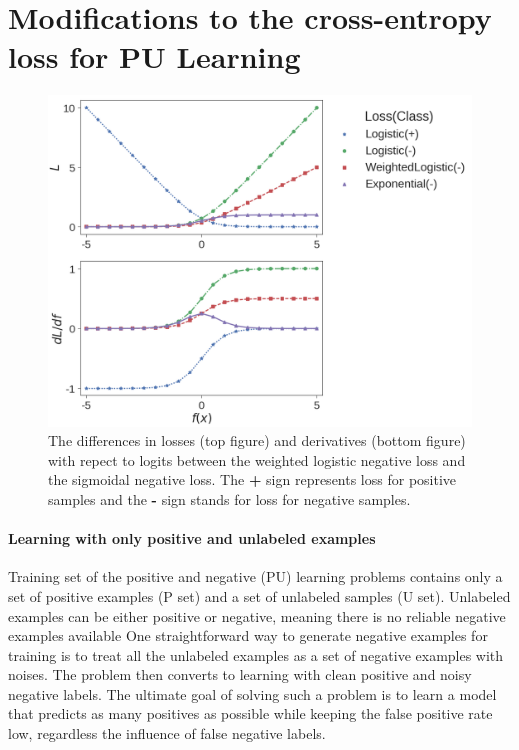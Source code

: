 \section{Modifications to the cross-entropy loss for PU Learning}
\label{sec:pulearning}



\begin{figure}[t]
\centering
   \includegraphics[width=1.05\linewidth]{img/losses}
\caption{
The differences in losses (top figure) and derivatives (bottom figure) with repect to logits between the weighted logistic negative loss and the sigmoidal negative loss.
The \textbf{+} sign represents loss for positive samples and the \textbf{-} sign stands for loss for negative samples.
}
\label{fig:losses}
\end{figure}


\paragraph{Learning with only positive and unlabeled examples}
Training set of the positive and negative (PU) learning problems contains only a set of positive examples (P set) and a set of unlabeled samples (U set).
Unlabeled examples can be either positive or negative, meaning there is no reliable negative examples available
One straightforward way to generate negative examples for training is to treat all the unlabeled examples as a set of negative examples with noises.
The problem then converts to learning with clean positive and noisy negative labels.
The ultimate goal of solving such a problem is to learn a model that predicts as many positives as possible while keeping the false positive rate low, regardless the influence of false negative labels.


